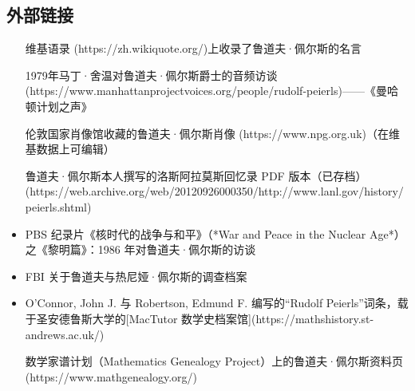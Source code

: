 \subsection{外部链接}
\begin{itemize}
\item [维基语录](https://zh.wikiquote.org/)上收录了鲁道夫·佩尔斯的名言
\item [1979年马丁·舍温对鲁道夫·佩尔斯爵士的音频访谈](https://www.manhattanprojectvoices.org/people/rudolf-peierls)——《曼哈顿计划之声》
\item [伦敦国家肖像馆收藏的鲁道夫·佩尔斯肖像](https://www.npg.org.uk)（在维基数据上可编辑）
\item [鲁道夫·佩尔斯本人撰写的洛斯阿拉莫斯回忆录 PDF 版本（已存档）](https://web.archive.org/web/20120926000350/http://www.lanl.gov/history/peierls.shtml)
\item PBS 纪录片《核时代的战争与和平》（*War and Peace in the Nuclear Age*）之《黎明篇》：1986 年对鲁道夫·佩尔斯的访谈
\item FBI 关于鲁道夫与热尼娅·佩尔斯的调查档案
\item O'Connor, John J. 与 Robertson, Edmund F. 编写的“Rudolf Peierls”词条，载于圣安德鲁斯大学的[MacTutor 数学史档案馆](https://mathshistory.st-andrews.ac.uk/)
\item [数学家谱计划（Mathematics Genealogy Project）上的鲁道夫·佩尔斯资料页](https://www.mathgenealogy.org/)
\end{itemize}
